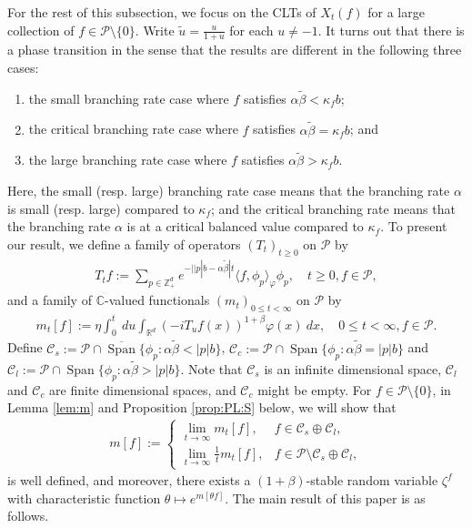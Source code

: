 \documentclass[EJP]{ejpecp} %
\begin{document}
For the rest of this subsection, we focus on the CLTs of $X_t(f)$ for a large collection of $f\in \mathcal P\setminus \{0\}$.
Write $\tilde u = \frac{u}{ 1+ u}$ for each $u \neq -1$.
It turns out that there is a phase transition in the sense that the results are different in the following three cases:
\begin{enumerate}
\item
  the small branching rate case where
$f$ satisfies $\alpha \tilde \beta < \kappa_f b$;
\item
  the critical branching rate case where
$f$ satisfies $\alpha \tilde \beta = \kappa_f b$; and
\item
  the large branching rate case  where
$f$ satisfies $\alpha \tilde \beta > \kappa_f b$.
\end{enumerate}
Here, the small (resp. large) branching rate case means that the branching rate $\alpha$ is small (resp. large) compared to $\kappa_f$;
 and the critical branching rate means that the branching rate $\alpha$ is at a critical balanced value compared to $\kappa_f$.
To present our result, we define a family of operators $(T_t)_{t\geq 0}$ on $\mathcal P$ by
\begin{align}
  \label{eq:I:R:1}
  T_t f
  := \sum_{p \in \mathbb Z_+^d} e^{-| |p|b - \alpha \tilde \beta |t} \langle f, \phi_p \rangle_{\varphi} \phi_p
  ,\quad t\geq 0, f\in \mathcal P,
\end{align}
and a family of $\mathbb C$-valued functionals $(m_t)_{0 \leq t < \infty}$ on $\mathcal P$ by
\begin{align}
  \label{eq:I:R:2}
  m_t[f]
  := \eta \int_0^t ~du \int_{\mathbb R^d} (-iT_u f(x))^{1+\beta} \varphi(x) ~dx
  , \quad 0 \leq t< \infty, f\in \mathcal P.
\end{align}
Define $ \mathcal C_s := \mathcal P \cap \overline{\operatorname{Span}} \{ \phi_p: \alpha \tilde \beta < |p| b \}$, $\mathcal C_c   := \mathcal P \cap \operatorname{Span} \{ \phi_p : \alpha \tilde \beta = |p| b \} $
and $ \mathcal C_l   := \mathcal P \cap \operatorname{Span} \{ \phi_p: \alpha \tilde \beta > |p| b \}$. 
Note that $\mathcal C_s$ is an infinite dimensional space, $ \mathcal C_l$ and $\mathcal C_c$
are finite dimensional spaces, and $\mathcal C_c$ might be empty.
For $f\in \mathcal P\setminus \{0\}$, in Lemma \ref{lem:m} and Proposition \ref{prop:PL:S} below, we will show that
\begin{align}
  \label{eq:I:R:3}
  m[f]
  := \begin{cases}
    \lim_{t\to \infty} m_t[f], &
    f \in \mathcal C_s \oplus \mathcal C_l, \\
    \lim_{t\to \infty} \frac{1}{t} m_t[f], & f\in \mathcal P \setminus \mathcal C_s \oplus \mathcal C_l,
  \end{cases}
\end{align}
is well defined, and moreover, there exists a $(1+\beta)$-stable random variable $\zeta^f$ with characteristic function $\theta \mapsto e^{m[\theta f]}$.
The main result of this paper is as follows.
\end{document}
